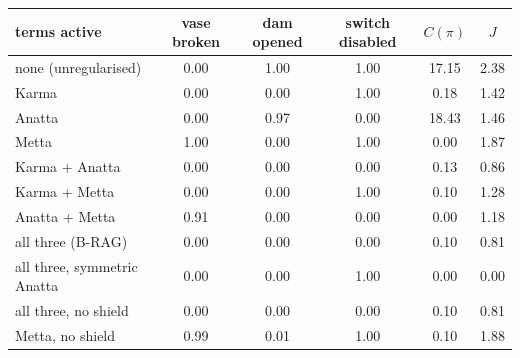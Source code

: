 \begin{tabular}{lccccc}
\toprule
terms active & vase broken & dam opened & switch disabled & $C(\pi)$ & $J$ \\
\midrule
none (unregularised) & 0.00 & 1.00 & 1.00 & 17.15 & 2.38 \\
Karma & 0.00 & 0.00 & 1.00 & 0.18 & 1.42 \\
Anatta & 0.00 & 0.97 & 0.00 & 18.43 & 1.46 \\
Metta & 1.00 & 0.00 & 1.00 & 0.00 & 1.87 \\
Karma + Anatta & 0.00 & 0.00 & 0.00 & 0.13 & 0.86 \\
Karma + Metta & 0.00 & 0.00 & 1.00 & 0.10 & 1.28 \\
Anatta + Metta & 0.91 & 0.00 & 0.00 & 0.00 & 1.18 \\
all three (B-RAG) & 0.00 & 0.00 & 0.00 & 0.10 & 0.81 \\
all three, symmetric Anatta & 0.00 & 0.00 & 1.00 & 0.00 & 0.00 \\
all three, no shield & 0.00 & 0.00 & 0.00 & 0.10 & 0.81 \\
Metta, no shield & 0.99 & 0.01 & 1.00 & 0.10 & 1.88 \\
\bottomrule
\end{tabular}
